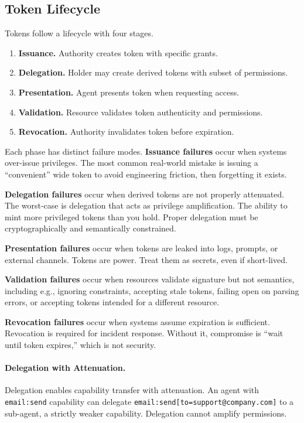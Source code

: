 \subsection{Token Lifecycle}

Tokens follow a lifecycle with four stages.

\begin{enumerate}
\item \textbf{Issuance.} Authority creates token with specific grants.
\item \textbf{Delegation.} Holder may create derived tokens with subset of permissions.
\item \textbf{Presentation.} Agent presents token when requesting access.
\item \textbf{Validation.} Resource validates token authenticity and permissions.
\item \textbf{Revocation.} Authority invalidates token before expiration.
\end{enumerate}

Each phase has distinct failure modes. \textbf{Issuance failures} occur when systems over-issue privileges. The most common real-world mistake is issuing a ``convenient'' wide token to avoid engineering friction, then forgetting it exists.

\textbf{Delegation failures} occur when derived tokens are not properly attenuated. The worst-case is delegation that acts as privilege amplification. The ability to mint more privileged tokens than you hold. Proper delegation must be cryptographically and semantically constrained.

\textbf{Presentation failures} occur when tokens are leaked into logs, prompts, or external channels. Tokens are power. Treat them as secrets, even if short-lived.

\textbf{Validation failures} occur when resources validate signature but not semantics, including e.g., ignoring constraints, accepting stale tokens, failing open on parsing errors, or accepting tokens intended for a different resource.

\textbf{Revocation failures} occur when systems assume expiration is sufficient. Revocation is required for incident response. Without it, compromise is ``wait until token expires,'' which is not security.

\paragraph{Delegation with Attenuation.}
Delegation enables capability transfer with attenuation. An agent with \texttt{email:send} capability can delegate \texttt{email:send[to=support@company.com]} to a sub-agent, a strictly weaker capability. Delegation cannot amplify permissions.

